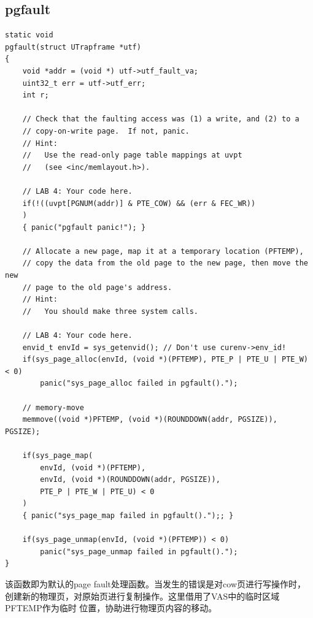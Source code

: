 \documentclass[12pt, letterpaper]{report}
\begin{document}
\newpage
\subsection{pgfault}

\lstset{style=CStyle}
\setmainfont{Consolas}
\begin{lstlisting}
static void
pgfault(struct UTrapframe *utf)
{
    void *addr = (void *) utf->utf_fault_va;
    uint32_t err = utf->utf_err;
    int r;

    // Check that the faulting access was (1) a write, and (2) to a
    // copy-on-write page.  If not, panic.
    // Hint:
    //   Use the read-only page table mappings at uvpt
    //   (see <inc/memlayout.h>).

    // LAB 4: Your code here.
    if(!((uvpt[PGNUM(addr)] & PTE_COW) && (err & FEC_WR))
    )
    { panic("pgfault panic!"); }

    // Allocate a new page, map it at a temporary location (PFTEMP),
    // copy the data from the old page to the new page, then move the new
    // page to the old page's address.
    // Hint:
    //   You should make three system calls.

    // LAB 4: Your code here.
    envid_t envId = sys_getenvid(); // Don't use curenv->env_id!
    if(sys_page_alloc(envId, (void *)(PFTEMP), PTE_P | PTE_U | PTE_W) < 0)
        panic("sys_page_alloc failed in pgfault().");

    // memory-move
    memmove((void *)PFTEMP, (void *)(ROUNDDOWN(addr, PGSIZE)), PGSIZE);

    if(sys_page_map(
        envId, (void *)(PFTEMP), 
        envId, (void *)(ROUNDDOWN(addr, PGSIZE)),
        PTE_P | PTE_W | PTE_U) < 0
    )
    { panic("sys_page_map failed in pgfault().");; }

    if(sys_page_unmap(envId, (void *)(PFTEMP)) < 0)
        panic("sys_page_unmap failed in pgfault().");
}
\end{lstlisting}
\setmainfont{Times New Roman}

\newpage
该函数即为默认的page fault处理函数。当发生的错误是对cow页进行写操作时，
创建新的物理页，对原始页进行复制操作。这里借用了VAS中的临时区域PFTEMP作为临时
位置，协助进行物理页内容的移动。
\end{document}
